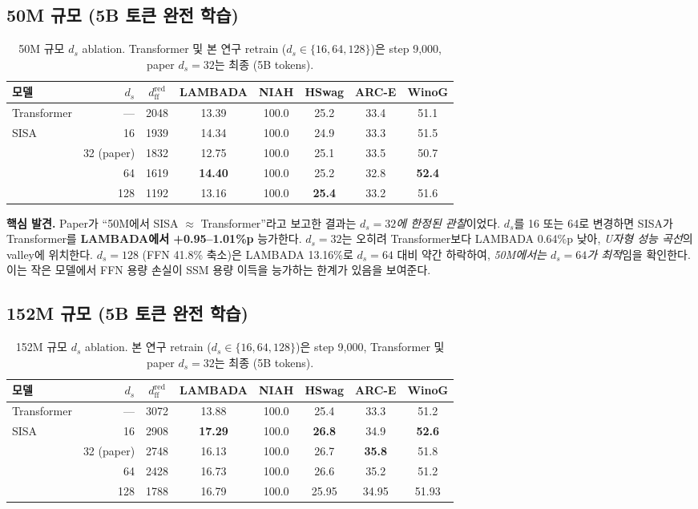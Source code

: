 \documentclass[11pt]{article}
\begin{document}
\subsection{50M 규모 (5B 토큰 완전 학습)}

\begin{table}[h]
\centering\small
\caption{50M 규모 $d_s$ ablation. Transformer 및 본 연구 retrain ($d_s \in \{16, 64, 128\}$)은 step 9,000, paper $d_s = 32$는 최종 (5B tokens).}
\label{tab:ds_50m}
\begin{tabular}{lrcccccc}
\toprule
모델 & $d_s$ & $d_{\text{ff}}^{\text{red}}$ & LAMBADA & NIAH & HSwag & ARC-E & WinoG \\
\midrule
Transformer & --- & 2048 & 13.39 & 100.0 & 25.2 & 33.4 & 51.1 \\
\midrule
\multirow{4}{*}{SISA} & 16 & 1939 & 14.34 & 100.0 & 24.9 & 33.3 & 51.5 \\
 & 32 (paper) & 1832 & 12.75 & 100.0 & 25.1 & 33.5 & 50.7 \\
 & 64 & 1619 & \textbf{14.40} & 100.0 & 25.2 & 32.8 & \textbf{52.4} \\
 & 128 & 1192 & 13.16 & 100.0 & \textbf{25.4} & 33.2 & 51.6 \\
\bottomrule
\end{tabular}
\end{table}

\textbf{핵심 발견.} Paper가 ``50M에서 SISA $\approx$ Transformer''라고 보고한 결과는 \textit{$d_s = 32$에 한정된 관찰}이었다. $d_s$를 16 또는 64로 변경하면 SISA가 Transformer를 \textbf{LAMBADA에서 +0.95--1.01\%p} 능가한다. $d_s = 32$는 오히려 Transformer보다 LAMBADA 0.64\%p 낮아, \textit{U자형 성능 곡선}의 valley에 위치한다. $d_s = 128$ (FFN 41.8\% 축소)은 LAMBADA 13.16\%로 $d_s = 64$ 대비 약간 하락하여, \textit{50M에서는 $d_s = 64$가 최적}임을 확인한다. 이는 작은 모델에서 FFN 용량 손실이 SSM 용량 이득을 능가하는 한계가 있음을 보여준다.

\subsection{152M 규모 (5B 토큰 완전 학습)}

\begin{table}[h]
\centering\small
\caption{152M 규모 $d_s$ ablation. 본 연구 retrain ($d_s \in \{16, 64, 128\}$)은 step 9,000, Transformer 및 paper $d_s = 32$는 최종 (5B tokens).}
\label{tab:ds_152m}
\begin{tabular}{lrcccccc}
\toprule
모델 & $d_s$ & $d_{\text{ff}}^{\text{red}}$ & LAMBADA & NIAH & HSwag & ARC-E & WinoG \\
\midrule
Transformer & --- & 3072 & 13.88 & 100.0 & 25.4 & 33.3 & 51.2 \\
\midrule
\multirow{4}{*}{SISA} & 16 & 2908 & \textbf{17.29} & 100.0 & \textbf{26.8} & 34.9 & \textbf{52.6} \\
 & 32 (paper) & 2748 & 16.13 & 100.0 & 26.7 & \textbf{35.8} & 51.8 \\
 & 64 & 2428 & 16.73 & 100.0 & 26.6 & 35.2 & 51.2 \\
 & 128 & 1788 & 16.79 & 100.0 & 25.95 & 34.95 & 51.93 \\
\bottomrule
\end{tabular}
\end{table}
\end{document}
